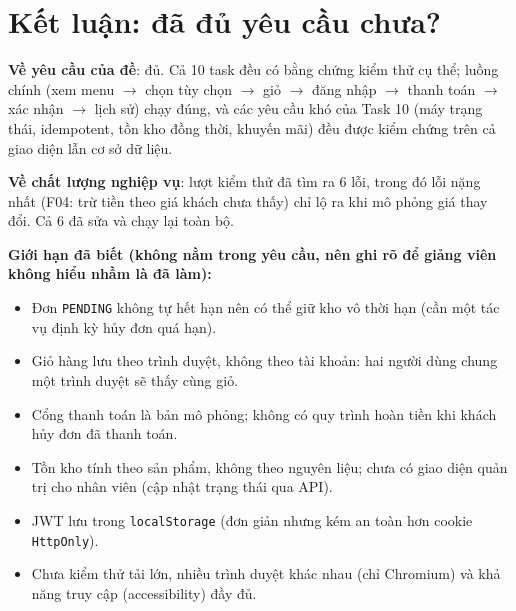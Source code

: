 \documentclass[a4paper,11pt]{article}
\begin{document}
\section{Kết luận: đã đủ yêu cầu chưa?}
\textbf{Về yêu cầu của đề}: đủ. Cả 10 task đều có bằng chứng kiểm thử cụ thể; luồng chính (xem menu $\to$ chọn tùy chọn $\to$ giỏ $\to$ đăng nhập $\to$ thanh toán $\to$ xác nhận $\to$ lịch sử) chạy đúng, và các yêu cầu khó của Task 10 (máy trạng thái, idempotent, tồn kho đồng thời, khuyến mãi) đều được kiểm chứng trên cả giao diện lẫn cơ sở dữ liệu.

\textbf{Về chất lượng nghiệp vụ}: lượt kiểm thử đã tìm ra 6 lỗi, trong đó lỗi nặng nhất (F04: trừ tiền theo giá khách chưa thấy) chỉ lộ ra khi mô phỏng giá thay đổi. Cả 6 đã sửa và chạy lại toàn bộ.

\textbf{Giới hạn đã biết (không nằm trong yêu cầu, nên ghi rõ để giảng viên không hiểu nhầm là đã làm):}
\begin{itemize}
\item Đơn \texttt{PENDING} không tự hết hạn nên có thể giữ kho vô thời hạn (cần một tác vụ định kỳ hủy đơn quá hạn).
\item Giỏ hàng lưu theo trình duyệt, không theo tài khoản: hai người dùng chung một trình duyệt sẽ thấy cùng giỏ.
\item Cổng thanh toán là bản mô phỏng; không có quy trình hoàn tiền khi khách hủy đơn đã thanh toán.
\item Tồn kho tính theo sản phẩm, không theo nguyên liệu; chưa có giao diện quản trị cho nhân viên (cập nhật trạng thái qua API).
\item JWT lưu trong \texttt{localStorage} (đơn giản nhưng kém an toàn hơn cookie \texttt{HttpOnly}).
\item Chưa kiểm thử tải lớn, nhiều trình duyệt khác nhau (chỉ Chromium) và khả năng truy cập (accessibility) đầy đủ.
\end{itemize}
\end{document}
